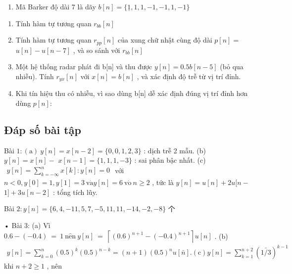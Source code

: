 \documentclass[
  10
]{article}
\providecommand{\tightlist}{%
  \setlength{\itemsep}{0pt}\setlength{\parskip}{0pt}}
\begin{document}
\begin{enumerate}
\def\labelenumi{\arabic{enumi}.}
\setcounter{enumi}{20}
\tightlist
\item
  Mã Barker độ dài 7 là dãy
  \(b [ n ] = \{ \underline { { { 1 } } } , 1 , 1 , - 1 , - 1 , 1 , - 1 \}\)
\end{enumerate}

\begin{enumerate}
\def\labelenumi{(\alph{enumi})}
\item
  Tính hàm tự tương quan \(r _ { b b } [ n ]\)
\item
  Tính hàm tự tương quan \(r _ { p p } [ n ]\) của xung chữ nhật cùng độ
  dài \(p [ n ] =\) \(u [ n ] - u [ n - 7 ]\) , và so sánh với
  \(r _ { b b } [ n ]\)
\item
  Một hệ thống radar phát đi b{[}n{]} và thu được
  \(y [ n ] = 0 . 5 b [ n - 5 ]\) (bỏ qua nhiễu). Tính
  \(r _ { y x } [ n ]\) với \(x [ n ] = b [ n ]\) , và xác định độ trễ
  từ vị trí đỉnh.
\item
  Khi tín hiệu thu có nhiễu, vì sao dùng b{[}n{]} dễ xác định đúng vị
  trí đỉnh hơn dùng \(p [ n ] \colon\)
\end{enumerate}

\subsection{Đáp số bài tập}\label{ux111uxe1p-sux1ed1-buxe0i-tux1eadp-1}

Bài
\(1 \colon ( \mathrm { a } ) \ y [ n ] = x [ n - 2 ] = \{ 0 , 0 , 1 , 2 , 3 \}\)
: dịch trễ 2 mẫu. (b) \(y [ n ] = x [ n ] -\)
\(x [ n - 1 ] = \{ 1 , 1 , 1 , - 3 \}\) : sai phân bậc nhất. (c)
\(\begin{array} { r } { y [ n ] = \sum _ { k = - \infty } ^ { n } x [ k ] \colon y [ n ] = 0 } \end{array}\)
với
\(n < 0 , y [ 0 ] = 1 , y [ 1 ] = 3 { \mathrm { ~ v } } { \dot { \mathrm { a } } } y [ n ] = 6 { \mathrm { ~ v } } { \dot { \mathrm { o } } } { \dot { \mathrm { ~ } } } n \geq 2\)
, tức là \(y [ n ] = u [ n ] + 2 u [ n -\) \(1 ] + 3 u [ n - 2 ]\) :
tổng tích lũy.

Bài
\(2 \colon y [ n ] = \{ 6 , 4 , - 1 1 , 5 , 7 , - 5 , 1 1 , 1 1 , - 1 4 , - 2 , - 8 \}\)
个

• Bài 3: (a) Vì
\(0 . 6 - ( - 0 . 4 ) \ = \ 1 \ \mathrm { n { \hat { e } n } } \ y [ n ] \ = \ \left\lceil ( 0 . 6 ) ^ { n + 1 } - ( - 0 . 4 ) ^ { n + 1 } \right\rceil u [ n ]\)
. (b)
\(\begin{array} { r } { y [ n ] = \sum _ { k = 0 } ^ { n } ( 0 . 5 ) ^ { k } ( 0 . 5 ) ^ { n - k } = ( n + 1 ) ( 0 . 5 ) ^ { n } u [ \bar { n } ] . \mathrm { ( c ) } y [ n ] = \sum _ { k = 1 } ^ { n + 2 } ( 1 \bar { / } 3 ) ^ { k - 1 } } \end{array}\)
khi \(n + 2 \ge 1\) , nên
\end{document}
